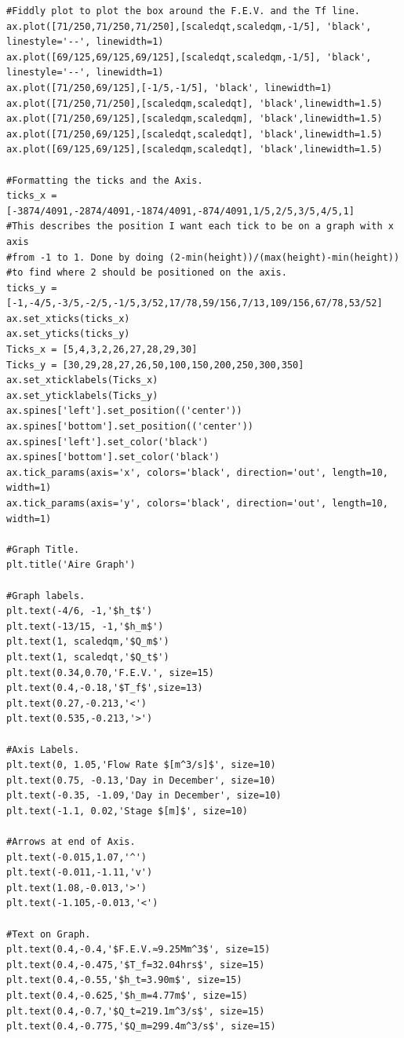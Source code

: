 \documentclass[11 pt, a4paper]{article}
\begin{document}
\begin{lstlisting}
#Fiddly plot to plot the box around the F.E.V. and the Tf line.
ax.plot([71/250,71/250,71/250],[scaledqt,scaledqm,-1/5], 'black', linestyle='--', linewidth=1)
ax.plot([69/125,69/125,69/125],[scaledqt,scaledqm,-1/5], 'black', linestyle='--', linewidth=1)
ax.plot([71/250,69/125],[-1/5,-1/5], 'black', linewidth=1)
ax.plot([71/250,71/250],[scaledqm,scaledqt], 'black',linewidth=1.5)
ax.plot([71/250,69/125],[scaledqm,scaledqm], 'black',linewidth=1.5)
ax.plot([71/250,69/125],[scaledqt,scaledqt], 'black',linewidth=1.5)
ax.plot([69/125,69/125],[scaledqm,scaledqt], 'black',linewidth=1.5)

#Formatting the ticks and the Axis.
ticks_x = [-3874/4091,-2874/4091,-1874/4091,-874/4091,1/5,2/5,3/5,4/5,1]
#This describes the position I want each tick to be on a graph with x axis
#from -1 to 1. Done by doing (2-min(height))/(max(height)-min(height))
#to find where 2 should be positioned on the axis.
ticks_y = [-1,-4/5,-3/5,-2/5,-1/5,3/52,17/78,59/156,7/13,109/156,67/78,53/52]
ax.set_xticks(ticks_x)
ax.set_yticks(ticks_y)
Ticks_x = [5,4,3,2,26,27,28,29,30]
Ticks_y = [30,29,28,27,26,50,100,150,200,250,300,350]
ax.set_xticklabels(Ticks_x)
ax.set_yticklabels(Ticks_y)
ax.spines['left'].set_position(('center'))
ax.spines['bottom'].set_position(('center'))
ax.spines['left'].set_color('black')
ax.spines['bottom'].set_color('black')
ax.tick_params(axis='x', colors='black', direction='out', length=10, width=1)
ax.tick_params(axis='y', colors='black', direction='out', length=10, width=1)

#Graph Title.
plt.title('Aire Graph')

#Graph labels.
plt.text(-4/6, -1,'$h_t$')
plt.text(-13/15, -1,'$h_m$')
plt.text(1, scaledqm,'$Q_m$')
plt.text(1, scaledqt,'$Q_t$')
plt.text(0.34,0.70,'F.E.V.', size=15)
plt.text(0.4,-0.18,'$T_f$',size=13)
plt.text(0.27,-0.213,'<')
plt.text(0.535,-0.213,'>')

#Axis Labels.
plt.text(0, 1.05,'Flow Rate $[m^3/s]$', size=10)
plt.text(0.75, -0.13,'Day in December', size=10)
plt.text(-0.35, -1.09,'Day in December', size=10)
plt.text(-1.1, 0.02,'Stage $[m]$', size=10)

#Arrows at end of Axis.
plt.text(-0.015,1.07,'^')
plt.text(-0.011,-1.11,'v')
plt.text(1.08,-0.013,'>')
plt.text(-1.105,-0.013,'<')

#Text on Graph.
plt.text(0.4,-0.4,'$F.E.V.≈9.25Mm^3$', size=15)
plt.text(0.4,-0.475,'$T_f=32.04hrs$', size=15)
plt.text(0.4,-0.55,'$h_t=3.90m$', size=15)
plt.text(0.4,-0.625,'$h_m=4.77m$', size=15)
plt.text(0.4,-0.7,'$Q_t=219.1m^3/s$', size=15)
plt.text(0.4,-0.775,'$Q_m=299.4m^3/s$', size=15)


\end{lstlisting}
\end{document}
